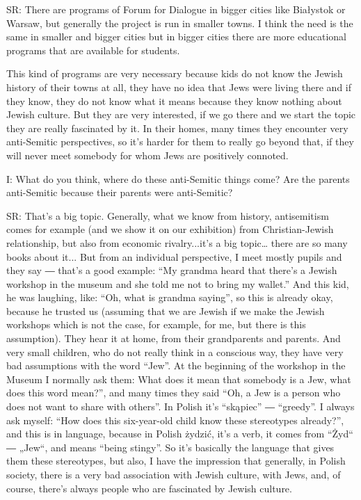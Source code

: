  

SR: There are programs of Forum for Dialogue in bigger cities like Białystok or Warsaw, but generally the project is run in smaller towns. I think the need is the same in smaller and bigger cities but in bigger cities there are more educational programs that are available for students. 

 

This kind of programs are very necessary because kids do not know the Jewish history of their towns at all, they have no idea that Jews were living there and if they know, they do not know what it means because they know nothing about Jewish culture. But they are very interested, if we go there and we start the topic they are really fascinated by it. 
In their homes, many times they encounter very anti-Semitic perspectives, so it’s harder for them to really go beyond that, if they will never meet somebody for whom Jews are positively connoted. 

 

I: What do you think, where do these anti-Semitic things come? Are the parents anti-Semitic because their parents were anti-Semitic? 

 

SR: That’s a big topic. Generally, what we know from history, antisemitism comes for example (and we show it on our exhibition) from Christian-Jewish relationship, but also from economic rivalry...it’s a big topic… there are so many books about it... But from an individual perspective, I meet mostly pupils and they say ― that’s a good example: “My grandma heard that there’s a Jewish workshop in the museum and she told me not to bring my wallet.” And this kid, he was laughing, like: “Oh, what is grandma saying”, so this is already okay, because he trusted us (assuming that we are Jewish if we make the Jewish workshops which is not the case, for example, for me, but there is this assumption). They hear it at home, from their grandparents and parents. And very small children, who do not really think in a conscious way, they have very bad assumptions with the word “Jew”. At the beginning of the workshop in the Museum I normally ask them: What does it mean that somebody is a Jew, what does this word mean?”, and many times they said “Oh, a Jew is a person who does not want to share with others”. In Polish it’s “skąpiec” ― “greedy”. I always ask myself: “How does this six-year-old child know these stereotypes already?”, and this is in language, because in Polish żydzić, it’s a verb, it comes from “Żyd“ ― „Jew“, and means “being stingy”. So it’s basically the language that gives them these stereotypes, but also, I have the impression that generally, in Polish society, there is a very bad association with Jewish culture, with Jews, and, of course, there’s always people who are fascinated by Jewish culture. 

